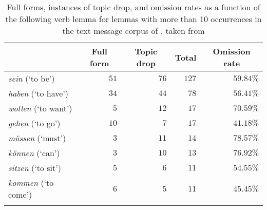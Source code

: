 \begin{table}
\caption[Verb frequency in  corpus]{Full forms, instances of topic drop, and omission rates as a function of the following verb lemma for lemmas with more than 10 occurrences in the text message corpus of \citet{androutsopoulos.schmidt2002}, taken from \citet[69]{androutsopoulos.schmidt2002}}
\centering
\begin{tabular}{lrrrr}
\lsptoprule
\multicolumn{1}{c}{Verb} & \multicolumn{1}{c}{Full form} & \multicolumn{1}{c}{Topic drop} & \multicolumn{1}{c}{Total} & \multicolumn{1}{c}{Omission rate} \\
\midrule
\textit{sein} (`to be') & $51$ & $76$ & $127$ & $59.84\%$ \\
\textit{haben} (`to have') & $34$ & $44$ & $78$ & $56.41\%$ \\
\textit{wollen} (`to want') & $5$ & $12$ & $17$ & $70.59\%$ \\
\textit{gehen} (`to go') & $10$ & $7$ & $17$ &  $41.18\%$ \\
\textit{müssen} (`must') & $3$ & $11$ & $14$ & $78.57\%$ \\
\textit{können} (`can') & $3$ & $10$ & $13$ & $76.92\%$ \\
\textit{sitzen} (`to sit') & $5$ & $6$  & $11$ & $54.55\%$ \\
\textit{kommen} (`to come') & $6$ & $5$ & $11$ & $45.45\%$ \\
\lspbottomrule
\end{tabular}
\label{tab:verb.type.as}
\end{table}

